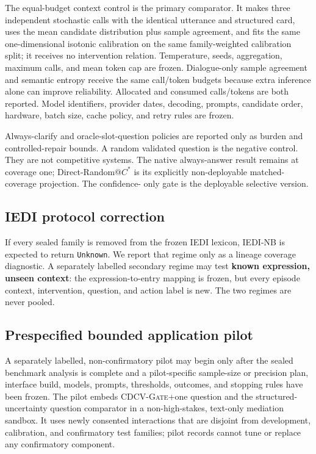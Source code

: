 \documentclass[preprint,12pt,authoryear]{elsarticle}
\newcommand{\cdcv}{\textsc{CDCV-Gate}}
\begin{document}
The equal-budget context control is the primary comparator. It makes three
independent stochastic calls with the identical utterance and structured card,
uses the mean candidate distribution plus sample agreement, and fits the same
one-dimensional isotonic calibration on the same family-weighted calibration
split; it receives no intervention relation. Temperature, seeds, aggregation,
maximum calls, and mean token cap are frozen. Dialogue-only sample agreement
and semantic entropy receive the same call/token budgets because extra
inference alone can improve reliability. Allocated and consumed calls/tokens
are both reported.
Model identifiers, provider dates, decoding, prompts, candidate order,
hardware, batch size, cache policy, and retry rules are frozen.

Always-clarify and oracle-slot-question policies are reported only as burden
and controlled-repair bounds. A random validated question is the negative
control. They are not competitive systems.
The native always-answer result remains at coverage one; Direct-Random@$C^*$
is its explicitly non-deployable matched-coverage projection. The confidence-
only gate is the deployable selective version.

\subsection{IEDI protocol correction}

If every sealed family is removed from the frozen IEDI lexicon, IEDI-NB is
expected to return \texttt{Unknown}. We report that regime only as a lineage
coverage diagnostic. A separately labelled secondary regime may test
\textbf{known expression, unseen context}: the expression-to-entry mapping is
frozen, but every episode context, intervention, question, and action label is
new. The two regimes are never pooled.

\subsection{Prespecified bounded application pilot}

A separately labelled, non-confirmatory pilot may begin only after the sealed
benchmark analysis is complete and a pilot-specific sample-size or precision
plan, interface build, models, prompts, thresholds, outcomes, and stopping
rules have been frozen. The pilot embeds \cdcv{}+one question and the
structured-uncertainty question comparator in a non-high-stakes, text-only
mediation sandbox. It uses newly consented interactions that are disjoint from
development, calibration, and confirmatory test families; pilot records cannot
tune or replace any confirmatory component.
\end{document}
